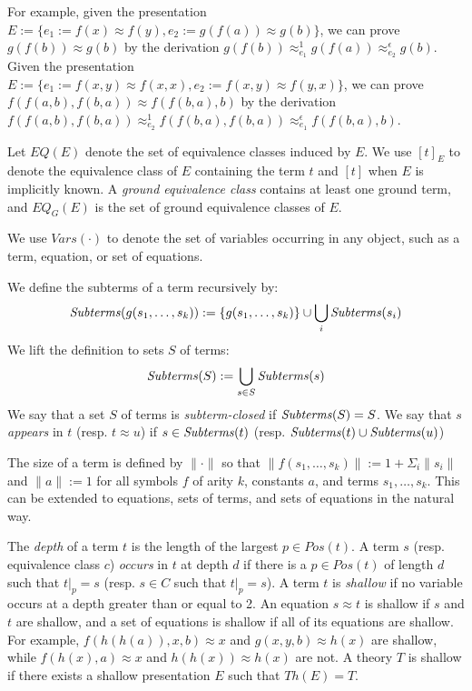 For example, given the presentation $E := \{ e_1 := f(x)\approx f(y), e_2 := g(f(a)) \approx g(b) \}$, we can prove $g(f(b))\approx g(b)$ by the derivation $g(f(b)) \approx_{e_1}^1 g(f(a)) \approx_{e_2}^\epsilon g(b)$.
Given the presentation $E := \{ e_1 := f(x,y) \approx f(x,x), e_2 := f(x,y)\approx f(y,x) \}$, we can prove $f(f(a,b),f(b,a)) \approx f(f(b,a), b)$ by the derivation $f(f(a,b),f(b,a)) \approx_{e_2}^1 f(f(b,a),f(b,a)) \approx_{e_1}^\epsilon f(f(b,a),b)$.


Let $EQ(E)$ denote the set of equivalence classes induced by $E$.
We use $[t]_E$ to denote the equivalence class of $E$ containing the term $t$ and $[t]$ when $E$ is implicitly known. 
A \emph{ground equivalence class} contains at least one ground term, and $EQ_G(E)$ is the set of ground equivalence classes of $E$.

We use $Vars(\cdot)$ to denote the set of variables occurring in any object, such as a term, equation, or set of equations.

We define the subterms of a term recursively by: 
\[\mathit{Subterms}(g(s_1,\dots,s_k)) :=  \\ \{g(s_1,\dots,s_k)\} \cup \bigcup_i \mathit{Subterms}(s_i)\]
We lift the definition to sets $S$ of terms: 
\[ \mathit{Subterms}(S) := \bigcup_{s \in S}\mathit{Subterms}(s) \]
We say that a set $S$ of terms is \emph{subterm-closed} if $\mathit{Subterms}(S) = S$. 
We say that $s$ \emph{appears} in $t$ (resp. $t \approx u$) if $s \in \mathit{Subterms}(t)$ (resp. $\mathit{Subterms}(t) \cup \mathit{Subterms}(u)$)

The size of a term is defined by $\| \cdot \|$ so that $\| f(s_1,\dots,s_k) \| := 1 + \Sigma_i \| s_i \|$ and $\| a \| := 1$ for all symbols $f$ of arity $k$, constants $a$, and terms $s_1, \dots, s_k$.
This can be extended to equations, sets of terms, and sets of equations in the natural way.

The \emph{depth} of a term $t$ is the length of the largest $p \in Pos(t)$.
A term $s$ (resp. equivalence class $c$) \emph{occurs} in $t$ at depth $d$ if there is a $p \in Pos(t)$ of length $d$ such that $t|_p = s$ (resp. $s \in C$ such that $t|_p = s$).
A term $t$ is \emph{shallow} if no variable occurs at a depth greater than or equal to 2. 
An equation $s \approx t$ is shallow if $s$ and $t$ are shallow, and a set of equations is shallow if all of its equations are shallow.
For example, $f(h(h(a)),x,b) \approx x$ and $g(x,y,b) \approx h(x)$ are shallow, while $f(h(x),a) \approx x$ and $h(h(x)) \approx h(x)$ are not.
A theory $T$ is shallow if there exists a shallow presentation $E$ such that $Th(E) = T$. 


